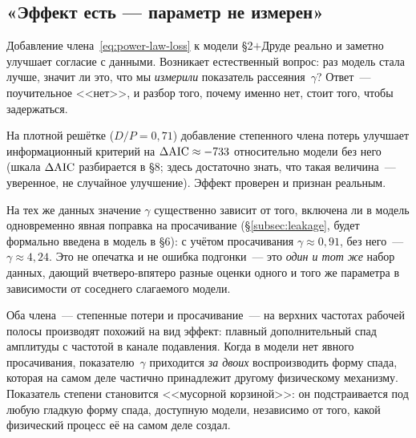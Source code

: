 \subsection{«Эффект есть — параметр не измерен»}
\label{subsec:no-measurement}

Добавление члена~\eqref{eq:power-law-loss} к модели §2$+$Друде реально и заметно улучшает
согласие с данными. Возникает естественный вопрос: раз модель стала лучше, значит ли это, что мы
\emph{измерили} показатель рассеяния~$\gamma$? Ответ~--- поучительное <<нет>>, и разбор того, почему
именно нет, стоит того, чтобы задержаться.

\begin{example}
На плотной решётке ($D/P=0{,}71$) добавление степенного члена потерь улучшает информационный
критерий на $\Delta\mathrm{AIC}\approx-733$ относительно модели без него (шкала $\Delta\mathrm{AIC}$ разбирается в §8;
здесь достаточно знать, что такая величина~--- уверенное, не случайное улучшение). Эффект
проверен и признан реальным.
\end{example}

\begin{warning}
На тех же данных значение $\gamma$ существенно зависит от того, включена ли в модель одновременно
явная поправка на просачивание (§\ref{subsec:leakage}, будет формально введена в модель в §6):
с учётом просачивания $\gamma\approx0{,}91$, без него~--- $\gamma\approx4{,}24$. Это не опечатка и
не ошибка подгонки~--- это \emph{один и тот же} набор данных, дающий вчетверо-впятеро разные оценки
одного и того же параметра в зависимости от соседнего слагаемого модели.
\end{warning}

\begin{intuition}
Оба члена~--- степенные потери и просачивание~--- на верхних частотах рабочей полосы производят
похожий на вид эффект: плавный дополнительный спад амплитуды с частотой в канале подавления. Когда
в модели нет явного просачивания, показателю~$\gamma$ приходится \emph{за двоих} воспроизводить
форму спада, которая на самом деле частично принадлежит другому физическому механизму. Показатель
степени становится <<мусорной корзиной>>: он подстраивается под любую гладкую форму спада, доступную
модели, независимо от того, какой физический процесс её на самом деле создал.
\end{intuition}


